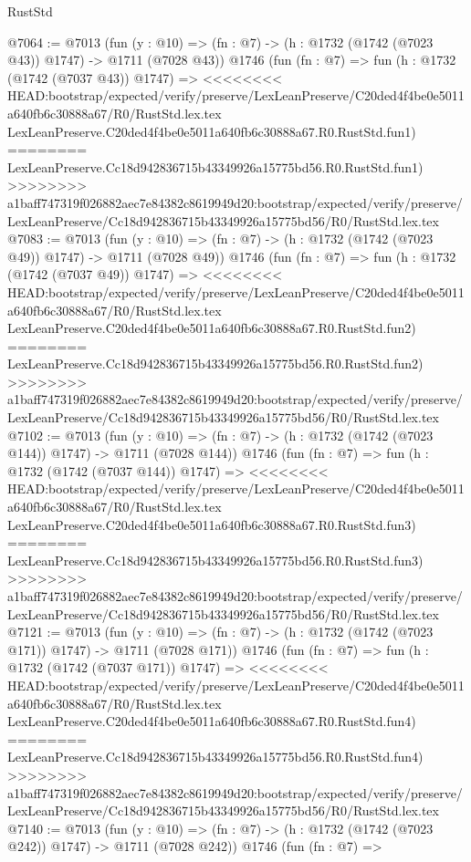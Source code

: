 \begin{lexlean}{RustStd}
\begin{coremodule}
{\begin{coremodule}
{{{{{{{{{{{{{@7064 := @7013
    (fun (y : @10) => (fn : @7) -> (h : @1732 (@1742 (@7023 @43)) @1747) -> @1711 (@7028 @43))
    @1746
    (fun (fn : @7) =>
    fun (h : @1732 (@1742 (@7037 @43)) @1747) =>
<<<<<<<< HEAD:bootstrap/expected/verify/preserve/LexLeanPreserve/C20ded4f4be0e5011a640fb6c30888a67/R0/RustStd.lex.tex
    LexLeanPreserve.C20ded4f4be0e5011a640fb6c30888a67.R0.RustStd.fun1)
========
    LexLeanPreserve.Cc18d942836715b43349926a15775bd56.R0.RustStd.fun1)
>>>>>>>> a1baff747319f026882aec7e84382c8619949d20:bootstrap/expected/verify/preserve/LexLeanPreserve/Cc18d942836715b43349926a15775bd56/R0/RustStd.lex.tex
@7083 := @7013
    (fun (y : @10) => (fn : @7) -> (h : @1732 (@1742 (@7023 @49)) @1747) -> @1711 (@7028 @49))
    @1746
    (fun (fn : @7) =>
    fun (h : @1732 (@1742 (@7037 @49)) @1747) =>
<<<<<<<< HEAD:bootstrap/expected/verify/preserve/LexLeanPreserve/C20ded4f4be0e5011a640fb6c30888a67/R0/RustStd.lex.tex
    LexLeanPreserve.C20ded4f4be0e5011a640fb6c30888a67.R0.RustStd.fun2)
========
    LexLeanPreserve.Cc18d942836715b43349926a15775bd56.R0.RustStd.fun2)
>>>>>>>> a1baff747319f026882aec7e84382c8619949d20:bootstrap/expected/verify/preserve/LexLeanPreserve/Cc18d942836715b43349926a15775bd56/R0/RustStd.lex.tex
@7102 := @7013
    (fun (y : @10) => (fn : @7) -> (h : @1732 (@1742 (@7023 @144)) @1747) -> @1711 (@7028 @144))
    @1746
    (fun (fn : @7) =>
    fun (h : @1732 (@1742 (@7037 @144)) @1747) =>
<<<<<<<< HEAD:bootstrap/expected/verify/preserve/LexLeanPreserve/C20ded4f4be0e5011a640fb6c30888a67/R0/RustStd.lex.tex
    LexLeanPreserve.C20ded4f4be0e5011a640fb6c30888a67.R0.RustStd.fun3)
========
    LexLeanPreserve.Cc18d942836715b43349926a15775bd56.R0.RustStd.fun3)
>>>>>>>> a1baff747319f026882aec7e84382c8619949d20:bootstrap/expected/verify/preserve/LexLeanPreserve/Cc18d942836715b43349926a15775bd56/R0/RustStd.lex.tex
@7121 := @7013
    (fun (y : @10) => (fn : @7) -> (h : @1732 (@1742 (@7023 @171)) @1747) -> @1711 (@7028 @171))
    @1746
    (fun (fn : @7) =>
    fun (h : @1732 (@1742 (@7037 @171)) @1747) =>
<<<<<<<< HEAD:bootstrap/expected/verify/preserve/LexLeanPreserve/C20ded4f4be0e5011a640fb6c30888a67/R0/RustStd.lex.tex
    LexLeanPreserve.C20ded4f4be0e5011a640fb6c30888a67.R0.RustStd.fun4)
========
    LexLeanPreserve.Cc18d942836715b43349926a15775bd56.R0.RustStd.fun4)
>>>>>>>> a1baff747319f026882aec7e84382c8619949d20:bootstrap/expected/verify/preserve/LexLeanPreserve/Cc18d942836715b43349926a15775bd56/R0/RustStd.lex.tex
@7140 := @7013
    (fun (y : @10) => (fn : @7) -> (h : @1732 (@1742 (@7023 @242)) @1747) -> @1711 (@7028 @242))
    @1746
    (fun (fn : @7) =>
}}}}}}}}}}}}}
\end{coremodule}}
\end{coremodule}
\end{lexlean}
